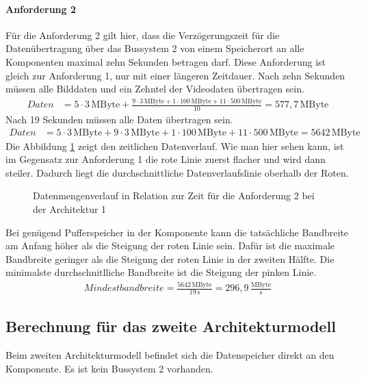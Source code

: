 \paragraph{Anforderung 2}
Für die Anforderung 2 gilt hier, dass die Verzögerungszeit für die Datenübertragung über das Bussystem 2 von einem Speicherort an alle Komponenten maximal zehn Sekunden betragen darf. Diese Anforderung ist gleich zur Anforderung 1, nur mit einer längeren Zeitdauer.
Nach zehn Sekunden müssen alle Bilddaten und ein Zehntel der Videodaten übertragen sein.
\begin{align}
	Daten &= 5 \cdot 3\,\mathrm{MByte} + \frac{9 \cdot 3 \,\mathrm{MByte} + 1 \cdot 100\,\mathrm{MByte} + 11 \cdot 500\,\mathrm{MByte}}{10} =  577,7\,\mathrm{MByte}
\end{align}
Nach 19 Sekunden müssen alle Daten übertragen sein.
\begin{align}
	Daten &= 5 \cdot 3\,\mathrm{MByte} + 9 \cdot 3 \,\mathrm{MByte} + 1 \cdot 100\,\mathrm{MByte} + 11 \cdot 500\,\mathrm{MByte} =  5642\,\mathrm{MByte}
\end{align}
Die Abbildung \ref{fig:arch1anf2} zeigt den zeitlichen Datenverlauf. Wie man hier sehen kann, ist im Gegensatz zur Anforderung 1 die rote Linie zuerst flacher und wird dann steiler. Dadurch liegt die durchschnittliche Datenverlaufslinie oberhalb der Roten.
\begin{figure}[]
	\centering
	
	\caption[Datenmengenverlauf in Relation zur Zeit für die Anforderung 2 bei der Architektur 1]{Datenmengenverlauf in Relation zur Zeit für die Anforderung 2 bei der Architektur 1}
	\label{fig:arch1anf2}
\end{figure}
Bei genügend Pufferspeicher in der Komponente kann die tatsächliche Bandbreite am Anfang höher als die Steigung der roten Linie sein. Dafür ist die maximale Bandbreite geringer als die Steigung der roten Linie in der zweiten Hälfte. Die minimalste durchschnitlliche Bandbreite ist die Steigung der pinken Linie.
\begin{align}
	Mindestbandbreite = \frac{5642\,\mathrm{MByte}}{19\,\mathrm{s}} = 296,9\,\frac{\mathrm{MByte}}{\mathrm{s}}
\end{align}
\subsection{Berechnung für das zweite Architekturmodell}
Beim zweiten Architekturmodell befindet sich die Datenspeicher direkt an den Komponente. Es ist kein Bussystem 2 vorhanden.
